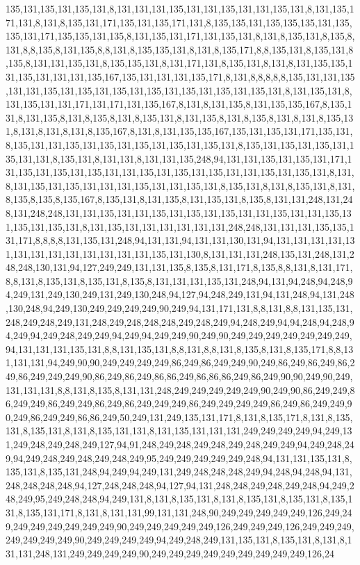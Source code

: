 135,131,135,131,135,131,8,131,131,131,135,131,131,135,131,131,135,131,8,131,135,171,131,8,131,8,135,131,171,135,131,135,171,131,8,135,135,131,135,135,135,131,135,135,131,171,135,135,131,135,8,131,135,131,171,131,135,131,8,131,8,135,131,8,135,8,131,8,8,135,8,131,135,8,8,131,8,135,135,131,8,131,8,135,171,8,8,135,131,8,135,131,8,135,8,131,131,135,131,8,135,135,131,8,131,171,131,8,135,131,8,131,8,131,135,135,131,135,131,131,131,135,167,135,131,131,131,135,171,8,131,8,8,8,8,8,135,131,131,135,131,131,135,131,135,131,135,131,135,131,135,131,135,131,135,131,8,131,135,131,8,131,135,131,131,171,131,171,131,135,167,8,131,8,131,135,8,131,135,135,167,8,135,131,8,131,135,8,131,8,135,8,131,8,135,131,8,131,135,8,131,8,135,8,131,8,131,8,135,131,8,131,8,131,8,131,8,135,167,8,131,8,131,135,135,167,135,131,135,131,171,135,131,8,135,131,131,135,131,135,131,135,131,135,131,135,131,8,135,131,135,131,135,131,135,131,131,8,135,131,8,131,131,8,131,131,135,248,94,131,131,135,131,135,131,171,131,135,131,135,131,135,131,131,135,131,135,131,135,131,131,135,131,135,131,8,131,8,131,135,131,135,131,131,131,135,131,131,135,131,8,135,131,8,131,8,135,131,8,131,8,135,8,135,8,135,167,8,135,131,8,131,135,8,131,135,131,8,135,8,131,131,248,131,248,131,248,248,131,131,135,131,131,135,131,135,131,135,131,131,135,131,131,135,131,135,131,135,131,8,131,135,131,131,131,131,131,131,248,248,131,131,131,135,135,131,171,8,8,8,8,131,135,131,248,94,131,131,94,131,131,130,131,94,131,131,131,131,131,131,131,131,131,131,131,131,131,135,131,130,8,131,131,131,248,135,131,248,131,248,248,130,131,94,127,249,249,131,131,135,8,135,8,131,171,8,135,8,8,131,8,131,171,8,8,131,8,135,131,8,135,131,8,135,8,131,131,131,135,131,248,94,131,94,248,94,248,94,249,131,249,130,249,131,249,130,248,94,127,94,248,249,131,94,131,248,94,131,248,130,248,94,249,130,249,249,249,249,90,249,94,131,171,131,8,8,131,8,8,131,135,131,248,249,248,249,131,248,249,248,248,248,249,248,249,94,248,249,94,94,248,94,248,94,249,94,249,248,249,249,94,249,94,249,249,90,249,90,249,249,249,249,249,249,249,94,131,131,131,135,131,8,8,131,135,131,8,8,131,8,8,131,8,135,8,131,8,135,171,8,8,131,131,131,94,249,90,90,249,249,249,249,86,249,86,249,249,90,249,86,249,86,249,86,249,86,249,249,249,90,86,249,86,249,86,86,249,86,86,86,249,86,249,90,90,249,90,249,131,131,131,8,8,131,8,135,8,131,131,248,249,249,249,249,249,90,249,90,86,249,249,86,249,249,86,249,249,86,249,86,249,249,249,86,249,249,249,249,86,249,86,249,249,90,249,86,249,249,86,86,249,50,249,131,249,135,131,171,8,131,8,135,171,8,131,8,135,131,8,135,131,8,131,8,135,131,131,8,131,135,131,131,131,249,249,249,249,94,249,131,249,248,249,248,249,127,94,91,248,249,248,249,248,249,248,249,249,94,249,248,249,94,249,248,249,248,249,248,249,95,249,249,249,249,249,248,94,131,131,135,131,8,135,131,8,135,131,248,94,249,94,249,131,249,248,248,248,249,94,248,94,248,94,131,248,248,248,248,94,127,248,248,248,94,127,94,131,248,248,249,248,249,248,94,249,248,249,95,249,248,248,94,249,131,8,131,8,135,131,8,131,8,135,131,8,135,131,8,135,131,8,135,131,171,8,131,8,131,131,99,131,131,248,90,249,249,249,249,249,126,249,249,249,249,249,249,249,249,90,249,249,249,249,249,126,249,249,249,126,249,249,249,249,249,249,249,90,249,249,249,249,94,249,248,249,131,135,131,8,135,131,8,131,8,131,131,248,131,249,249,249,249,90,249,249,249,249,249,249,249,249,249,126,24